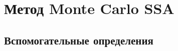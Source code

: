 \documentclass[specialist,
substylefile = spbu_report.rtx,
subf,12pt]{disser}
\theoremstyle{definition}
\begin{document}

\chapter{Метод Monte Carlo SSA}\label{chpt:mcssa}

\section{Вспомогательные определения}
\end{document}
